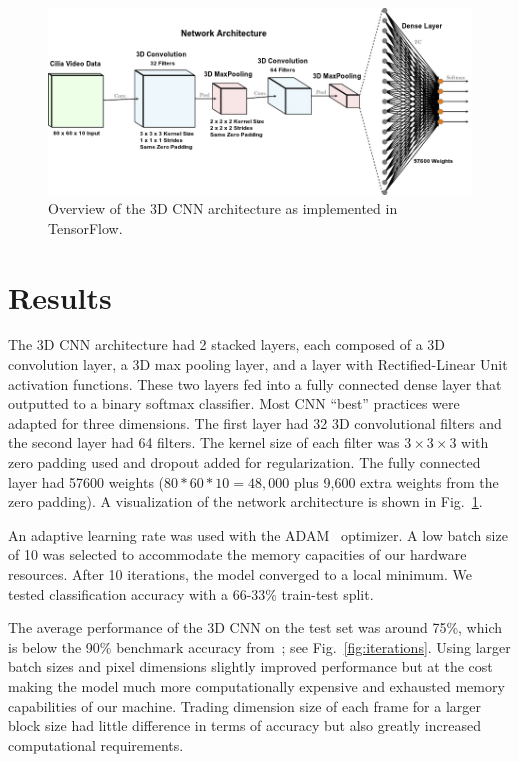 \begin{figure}
\includegraphics[scale=1.2]{arch}
\caption{Overview of the 3D CNN architecture as implemented in TensorFlow.}
\label{fig:cnn}
\end{figure}

\section{Results}

The 3D CNN architecture had 2 stacked layers, each composed of a 3D convolution layer, a 3D max pooling layer, and a layer with Rectified-Linear Unit \cite{nair2010rectified} activation functions. These two layers fed into a fully connected dense layer that outputted to a binary softmax classifier. Most CNN ``best'' practices \cite{goodfellow_bengio_courville_2016} were adapted for three dimensions. The first layer had 32 3D convolutional filters and the second layer had 64 filters. The kernel size of each filter was $3 \times 3 \times 3$ with zero padding used and dropout \cite{srivastava2014dropout} added for regularization. The fully connected layer had 57600 weights ($80 * 60 * 10 = 48,000$ plus 9,600 extra weights from the zero padding). A visualization of the network architecture is shown in Fig.~\ref{fig:cnn}.

An adaptive learning rate was used with the ADAM~\cite{kingma2014adam} optimizer. A low batch size of 10 was selected to accommodate the memory capacities of our hardware resources. After 10 iterations, the model converged to a local minimum. We tested classification accuracy with a 66-33\% train-test split. 

The average performance of the 3D CNN on the test set was around 75\%, which is below the 90\% benchmark accuracy from~\cite{quinn2015automated}; see Fig.~\ref{fig:iterations}. Using larger batch sizes and pixel dimensions slightly improved performance but at the cost making the model much more computationally expensive and exhausted memory capabilities of our machine. Trading dimension size of each frame for a larger block size had little difference in terms of accuracy but also greatly increased computational requirements.  

